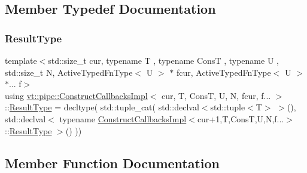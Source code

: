 \subsection{Member Typedef Documentation}
\mbox{\label{structvt_1_1pipe_1_1_construct_callbacks_impl_3_01cur_00_01_t_00_01_cons_t_00_01_u_00_01_n_00_01fcur_00_01f_8_8_8_01_4_a294fdd76c66fb6d0b700474df14313ab}} 
\subsubsection{\texorpdfstring{Result\+Type}{ResultType}}
{\footnotesize\ttfamily template$<$std\+::size\+\_\+t cur, typename T , typename ConsT , typename U , std\+::size\+\_\+t N, Active\+Typed\+Fn\+Type$<$ U $>$ $\ast$ fcur, Active\+Typed\+Fn\+Type$<$ U $>$ $\ast$... f$>$ \\
using \hyperlink{structvt_1_1pipe_1_1_construct_callbacks_impl}{vt\+::pipe\+::\+Construct\+Callbacks\+Impl}$<$ cur, T, ConsT, U, N, fcur, f... $>$\+::\hyperlink{structvt_1_1pipe_1_1_construct_callbacks_impl_3_01cur_00_01_t_00_01_cons_t_00_01_u_00_01_n_00_01fcur_00_01f_8_8_8_01_4_a294fdd76c66fb6d0b700474df14313ab}{Result\+Type} =  decltype( std\+::tuple\+\_\+cat( std\+::declval$<$std\+::tuple$<$T$>$ $>$(), std\+::declval$<$ typename \hyperlink{structvt_1_1pipe_1_1_construct_callbacks_impl}{Construct\+Callbacks\+Impl}$<$cur+1,T,ConsT,U,N,f...$>$\+::\hyperlink{structvt_1_1pipe_1_1_construct_callbacks_impl_3_01cur_00_01_t_00_01_cons_t_00_01_u_00_01_n_00_01fcur_00_01f_8_8_8_01_4_a294fdd76c66fb6d0b700474df14313ab}{Result\+Type} $>$() ))}



\subsection{Member Function Documentation}
\mbox{\label{structvt_1_1pipe_1_1_construct_callbacks_impl_3_01cur_00_01_t_00_01_cons_t_00_01_u_00_01_n_00_01fcur_00_01f_8_8_8_01_4_a6ba83bfa254c983cb9c1690ccb7714f5}} 
